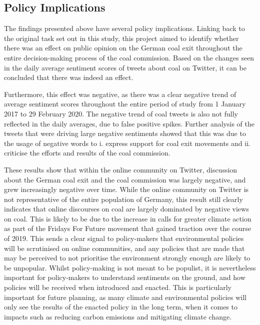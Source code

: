 \documentclass[12pt,onecolumn,twoside]{layout}
\begin{document}
\subsection*{Policy Implications}
The findings presented above have several policy implications. Linking back to the original task set out in this study, this project aimed to identify whether there was an effect on public opinion on the German coal exit throughout the entire decision-making process of the coal commission. Based on the changes seen in the daily average sentiment scores of tweets about coal on Twitter, it can be concluded that there was indeed an effect.

Furthermore, this effect was negative, as there was a clear negative trend of average sentiment scores throughout the entire period of study from 1 January 2017 to 29 February 2020. The negative trend of coal tweets is also not fully reflected in the daily averages, due to false positive spikes. Further analysis of the tweets that were driving large negative sentiments showed that this was due to the usage of negative words to i. express support for coal exit movements and ii. criticise the efforts and results of the coal commission.

These results show that within the online community on Twitter, discussion about the German coal exit and the coal commission was largely negative, and grew increasingly negative over time. While the online community on Twitter is not representative of the entire population of Germany, this result still clearly indicates that online discourses on coal are largely dominated by negative views on coal. This is likely to be due to the increase in calls for greater climate action as part of the Fridays For Future movement that gained traction over the course of 2019. This sends a clear signal to policy-makers that environmental policies will be scrutinised on online communities, and any policies that are made that may be perceived to not prioritise the environment strongly enough are likely to be unpopular. Whilst policy-making is not meant to be populist, it is nevertheless important for policy-makers to understand sentiments on the ground, and how policies will be received when introduced and enacted. This is particularly important for future planning, as many climate and environmental policies will only see the results of the enacted policy in the long term, when it comes to impacts such as reducing carbon emissions and mitigating climate change.
\end{document}
